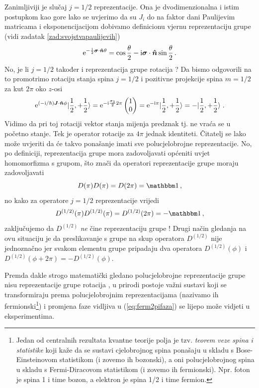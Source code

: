 Zanimljiviji je slučaj $j=1/2$ reprezentacije. Ona je dvodimenzionalna i
istim postupkom kao gore lako se uvjerimo da su $J_i$ do na faktor
dani Paulijevim matricama i eksponencijacijom dobivamo definicionu
vjernu reprezentaciju grupe  (vidi zadatak  \ref{zad:svojstvapaulijevih})
\begin{equation}
 \rme^{-\frac{\rmi}{2}\vec{\sigma}\cdot\unitn \theta} =
\cos \frac{\theta}{2}-\rmi\vec{\sigma}\cdot\unitn \sin\frac{\theta}{2} \,.
\end{equation}
No, je li $j=1/2$ također i reprezentacija grupe rotacija ?
Da bismo odgovorili na to promotrimo rotaciju 
stanja spina $j=1/2$ i pozitivne projekcije spina $m=1/2$ za 
kut $2\pi$ oko $z$-osi
\begin{equation}
    \rme^{(-\rmi/\hbar)\vec{J}\cdot\unitn\phi}\ket{\frac{1}{2}, +\frac{1}{2}} =
    \rme^{-\rmi\frac{\sigma_3}{2} 2 \pi} \begin{pmatrix} 1 \\ 0 \end{pmatrix} =
    \rme^{-\rmi \pi}\ket{\frac{1}{2}, +\frac{1}{2}} =
    -\ket{\frac{1}{2}, +\frac{1}{2}} \;.
    \label{eq:ferm2pifaza}
\end{equation}
Vidimo da pri toj rotaciji vektor stanja mijenja predznak tj. ne vraća se u početno stanje.
Tek je operator rotacije za $4\pi$ jednak identiteti.  Čitatelj
se lako može uvjeriti da će takvo ponašanje imati sve polucjelobrojne
reprezentacije.
No, po definiciji, reprezentacija grupe  mora zadovoljavati
općeniti uvjet homomorfizma s grupom, što znači da operatori
reprezentacije grupe  moraju zadovoljavati
\begin{equation}
    D(\pi)D(\pi)=D(2\pi)=\Eins \,,
\end{equation}
no kako za operatore $j=1/2$ reprezentacije vrijedi
\begin{equation}
    D^{(1/2)}(\pi)D^{(1/2)}(\pi)=D^{(1/2)}(2\pi)=-\Eins \,,
\end{equation}
zaključujemo da $D^{(1/2)}$
\emph{ne} čine reprezentaciju grupe ! Drugi način gledanja
na ovu situaciju je da preslikavanje s grupe  na
skup operatora  $D^{(1/2)}$ nije jednoznačno jer svakom elementu
grupe pripadaju dva operatora $D^{(1/2)}(\phi)$ i 
$D^{(1/2)}(\phi + 2\pi) = -D^{(1/2)}(\phi)$.

Premda dakle strogo matematički gledano polucjelobrojne reprezentacije
gru\-pe  nisu reprezentacije grupe rotacija , u prirodi
postoje važni sustavi koji se transformiraju prema polucjelobrojnim
reprezentacijama (nazivamo ih fermionski\footnote{%
      
Jedan od centralnih rezultata kvantne teorije polja je tzv.
\emph{teorem  veze spina i statistike} koji kaže da se sustavi
cjelobrojnog spina ponašaju u skladu s Bose-Einsteinovom
statistikom (i zovemo ih bozonski), a oni polucjelobrojnog spina
u skladu s Fermi-Diracovom statistikom (i zovemo ih fermionski).
Npr. foton je spina 1 i time bozon, a elektron je spina 1/2 i time fermion.})
 i promjena faze vidljiva u (\ref{eq:ferm2pifaza})
se lijepo može vidjeti u eksperimentima.

